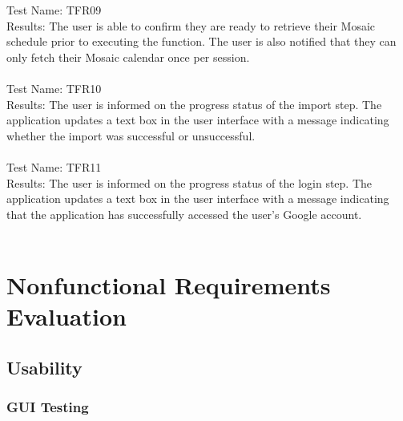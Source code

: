 \documentclass[12pt, titlepage]{article}
\begin{document}
\newpage	 %
	Test Name: TFR09 \\
	
	Results: The user is able to confirm they are ready to retrieve their Mosaic schedule prior to executing the function. The user is also notified that they can only fetch their Mosaic calendar once per session. \\ \\	

	Test Name: TFR10 \\
	
	Results: The user is informed on the progress status of the import step. The application updates a text box in the user interface with a message indicating whether the import was successful or unsuccessful. \\ \\		

	Test Name: TFR11 \\
	
	Results: The user is informed on the progress status of the login step. The application updates a text box in the user interface with a message indicating that the application has successfully accessed the user's Google account.\\ \\	
	
\section{Nonfunctional Requirements Evaluation}

\subsection{Usability}

	\subsubsection{GUI Testing}
	
\end{document}
